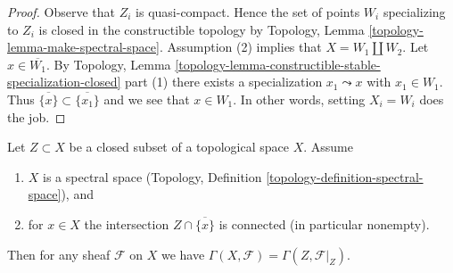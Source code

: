 \begin{proof}
Observe that $Z_i$ is quasi-compact. Hence the set of points
$W_i$ specializing to $Z_i$ is closed in the constructible topology
by Topology, Lemma \ref{topology-lemma-make-spectral-space}.
Assumption (2) implies that $X = W_1 \amalg W_2$.
Let $x \in \overline{W_1}$. By Topology, Lemma
\ref{topology-lemma-constructible-stable-specialization-closed} part (1)
there exists a specialization $x_1 \leadsto x$ with $x_1 \in W_1$.
Thus $\overline{\{x\}} \subset \overline{\{x_1\}}$ and we see
that $x \in W_1$. In other words, setting $X_i = W_i$ does the job.
\end{proof}

\begin{lemma}
\label{lemma-h0-topological}
Let $Z \subset X$ be a closed subset of a topological space $X$.
Assume
\begin{enumerate}
\item $X$ is a spectral space
(Topology, Definition \ref{topology-definition-spectral-space}), and
\item for $x \in X$ the intersection $Z \cap \overline{\{x\}}$
is connected (in particular nonempty).
\end{enumerate}
Then for any sheaf $\mathcal{F}$ on $X$ we have
$\Gamma(X, \mathcal{F}) = \Gamma(Z, \mathcal{F}|_Z)$.
\end{lemma}

